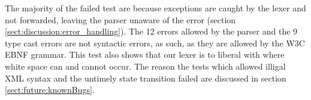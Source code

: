 The majority of the failed test are because exceptions are caught by the lexer and not forwarded, leaving the parser unaware of the error (section \ref{sect:discussion:error_handling}). The 12 errors allowed by the parser and the 9 type cast errors are not syntactic errors, as such, as they are allowed by the W3C EBNF grammar. This test also shows that our lexer is to liberal with where white space can and cannot occur. The reason the tests which allowed illigal XML syntax and the untimely state transition failed are discussed in section \ref{sect:future:knownBugs}.
